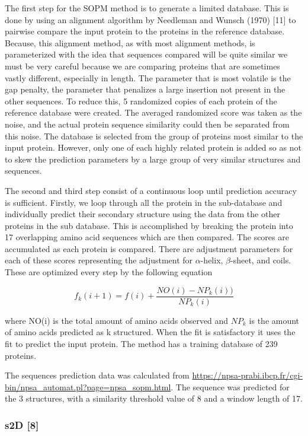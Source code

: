 \documentclass{article}
\begin{document}
The first step for the SOPM method is to generate a limited database. This is done by using an alignment algorithm by Needleman and Wunsch (1970) [11] to pairwise compare the input protein to the proteins in the reference database. Because, this alignment method, as with most alignment methods, is parameterized with the idea that sequences compared will be quite similar we must be very careful because we are comparing proteins that are sometimes vastly different, especially in length. The parameter that is most volatile is the gap penalty, the parameter that penalizes a large insertion not present in the other sequences. To reduce this, 5 randomized copies of each protein of the reference database were created. The averaged randomized score was taken as the noise, and the actual protein sequence similarity could then be separated from this noise. The database is selected from the group of proteins most similar to the input protein. However, only one of each highly related protein is added so as not to skew the prediction parameters by a large group of very similar structures and sequences. 

The second and third step consist of a continuous loop until prediction accuracy is sufficient. Firstly, we loop through all the protein in the sub-database and individually predict their secondary structure using the data from the other proteins in the sub database. This is accomplished by breaking the protein into 17 overlapping amino acid sequences which are then compared. The scores are accumulated as each protein is compared. There are adjustment parameters for each of these scores representing the adjustment for $\alpha$-helix, $\beta$-sheet, and coils. These are optimized every step by the following equation

$$f_k(i+1) = f(i) + \frac{NO(i)-NP_k(i))}{NP_k(i)}$$

where NO(i) is the total amount of amino acids observed and $NP_k$ is the amount of amino acids predicted as k structured. When the fit is satisfactory it uses the fit to predict the input protein. The method has a training database of 239 proteins.

The sequences prediction data was calculated from \url{https://npsa-prabi.ibcp.fr/cgi-bin/npsa_automat.pl?page=npsa_sopm.html}. The sequence was predicted for the 3 structures, with a similarity threshold value of 8 and a window length of 17.

\subsubsection{s2D [8]}
\end{document}
